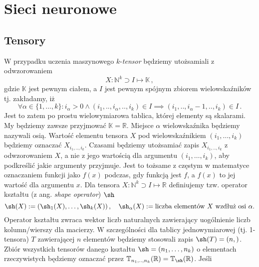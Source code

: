 \documentclass{myclass}
\begin{document}
\linesep
\newpage

\section{Sieci neuronowe}

\subsection{Tensory}

W przypadku uczenia maszynowego \(k\)-\textit{tensor} będziemy utożsamiali z odwzorowaniem
\begin{equation*}
    X:\mathbb{N}^k\supset I \mapsto \mathbb{K}\,,
\end{equation*}
gdzie \(\mathbb{K}\) jest pewnym ciałem, a \(I\) jest pewnym spójnym zbiorem wielowskaźników tj.
zakładamy, iż 
\begin{equation*}
    \forall \alpha \in
    \{1,\ldots, k\} : i_\alpha > 0 \land (i_1,..,i_\alpha,..,i_k) \in I \implies (i_1,..,i_\alpha -
    1,..,i_k) \in I\,.
\end{equation*}
Jest to zatem po prostu wielowymiarowa tablica, której elementy są skalarami. My będziemy zawsze
przyjmować \(\mathbb{K} = \mathbb{R}\). Miejsce \(\alpha\) wielowskaźnika będziemy nazywali osią.
Wartość elementu tensora \(X\) pod wielowskaźnikiem \((i_1, \ldots, i_k)\) będziemy oznaczać
\(X_{i_1,..,i_k}\). Czasami będziemy utożsamiać zapis \(X_{i_1,..,i_k}\) z odwzorowaniem \(X\), a
nie z jego wartością dla argumentu \((i_1, \ldots, i_k)\), aby podkreślić jakie argumenty przyjmuje.
Jest to tożsame z częstym w matematyce oznaczaniem funkcji jako \(f(x)\) podczas, gdy funkcją jest
\(f\), a \(f(x)\) to jej wartość dla argumentu \(x\).\hfill \break
Dla tensora \(X:\mathbb{N}^k\supset I \mapsto \mathbb{R}\) definiujemy tzw. operator kształtu (z
ang. \textit{shape operator}) \(\sh\)
\begin{equation*}
    \sh(X) := (\sh_1(X), \ldots, \sh_k(X))\,,\quad \sh_\alpha(X) := \text{liczba elementów \(X\) wzdłuż osi \(\alpha\).}
\end{equation*}
Operator kształtu zwraca wektor liczb naturalnych zawierający uogólnienie liczb kolumn/wierszy dla
macierzy. W szczególności dla tablicy jednowymiarowej (tj. 1-tensora) \(T\) zawierającej \(n\)
elementów będziemy stosowali zapis \(\sh(T) = (n,)\).\hfill \break
Zbiór wszystkich tensorów danego kształtu \(\sh=(n_1,\ldots,n_k)\) o elementach rzeczywistych
będziemy oznaczać przez \(\mathbb{T}_{n_1,..,n_k}(\mathbb{R}) = \mathbb{T}_\sh(\mathbb{R})\). Jeśli
\end{document}
